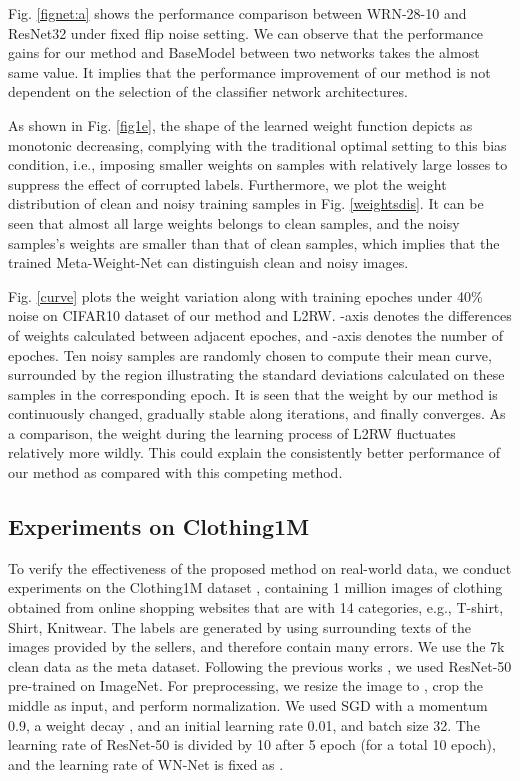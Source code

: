 \documentclass{article}
\begin{document}
	


	Fig. \ref{fignet:a} shows the performance comparison between WRN-28-10 and ResNet32 under fixed flip noise setting. We can observe that the performance gains for our method and BaseModel between two networks takes the almost same value. It implies that the performance improvement of our method is not dependent on the selection of the classifier network architectures.
	
	As shown in Fig. \ref{fig1e}, the shape of the learned weight function depicts as monotonic decreasing, complying with the traditional optimal setting to this bias condition, i.e., imposing smaller weights on samples with relatively large losses to suppress the effect of corrupted labels. Furthermore, we plot the weight distribution of clean and noisy training samples in Fig. \ref{weightsdis}. It can be seen that almost all large weights belongs to clean samples, and the noisy samples's weights are smaller than that of clean samples, which implies that the trained Meta-Weight-Net can distinguish clean and noisy images.
	
	Fig. \ref{curve} plots the weight variation along with training epoches under 40\% noise on CIFAR10 dataset of our method and L2RW. -axis denotes the differences of weights calculated between adjacent epoches, and -axis denotes the number of epoches. Ten noisy samples are randomly chosen to compute their mean curve, surrounded by the region illustrating the standard deviations calculated on these samples in the corresponding epoch. It is seen that the weight by our method is continuously changed, gradually stable along iterations, and finally converges. As a comparison, the weight during the learning process of L2RW fluctuates relatively more wildly. This could explain the consistently better performance of our method as compared with this competing method.
	
	
	\subsection{Experiments on Clothing1M}\label{real}
	To verify the effectiveness of the proposed method on real-world data, we conduct experiments on the Clothing1M dataset \cite{xiao2015learning}, containing 1 million images of clothing obtained from online shopping websites that are with 14 categories, e.g.,
	T-shirt, Shirt, Knitwear. The labels are generated by using surrounding texts of the images provided by the sellers, and therefore contain many errors. We use the 7k clean data as the meta dataset. Following the previous works \cite{patrini2017making,tanaka2018joint}, we used ResNet-50 pre-trained on ImageNet. 
	For preprocessing, we resize the image to , crop the middle  as input, and perform normalization.  We used SGD with a momentum 0.9, a weight decay , and an initial learning rate 0.01, and batch size 32. The learning rate of ResNet-50 is divided by 10 after 5 epoch (for a total 10 epoch), and the learning rate of WN-Net is fixed as .
	
\end{document}
